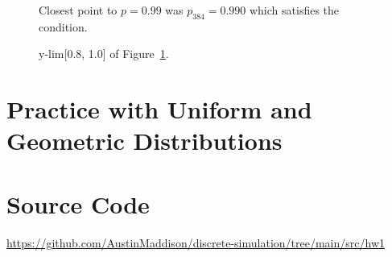 \documentclass[twocolumn]{article}
\begin{document}
\begin{figure}[H]
    \centering
    \caption{Closest point to $p=0.99$ was $p_{384}=0.990$ which satisfies the condition.}
    \label{fig:Figure2}
\end{figure}

\begin{figure}[H]
    \centering
    \caption{y-lim[0.8, 1.0] of Figure~\ref{fig:Figure2}.}
\end{figure}


\section{Practice with Uniform and Geometric Distributions}


\section*{Source Code}
\href{https://github.com/AustinMaddison/discrete-simulation/tree/main/src/hw1}{https://github.com/AustinMaddison/discrete-simulation/tree/main/src/hw1}


%
%
\end{document}
